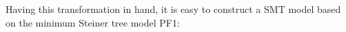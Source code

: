 

Having this transformation in hand, it is easy to construct a SMT model based on the minimum Steiner tree model PF1:

